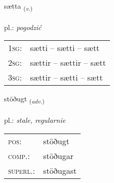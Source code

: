 \documentclass[frontgrid, backgrid]{flacards}\usepackage[]{graphicx}\usepackage[]{xcolor}
\begin{document}
\renewcommand{\flhead}{\vskip5pt \fboxsep=0pt {\small\bfseries\footnotesize Sagnorð | Verb}}
\renewcommand{\fcfoot}{\vskip5pt \fboxsep=0pt \hspace{2pt}{\small\bfseries\footnotesize 2K}}

\renewcommand{\blhead}{\vskip5pt {\small\bfseries\footnotesize Sagnorð | Verb }}
\renewcommand{\bcfoot}{\vskip5pt \hspace{2pt}{\small\bfseries\footnotesize 2K}}


{sætta \small{\textsubscript{(\textit{v.})}} \\[1ex] %
\textphonetic{[saihta]} \\
pl.: \emph{pogodzić} \\  [2ex]
\renewcommand*{\arraystretch}{0.8}
\begin{tabular}{p{1cm}l}
\textsc{1sg}: & sætti -- sætti -- sætt \\ 
\textsc{2sg}: & sættir -- sættir -- sætt \\ 
\textsc{3sg}: & sættir -- sætti -- sætt \\ 
\end{tabular}
}

\renewcommand{\flhead}{\vskip5pt \fboxsep=0pt {\small\bfseries\footnotesize Atviksorð | Adverb}}
\renewcommand{\fcfoot}{\vskip5pt \fboxsep=0pt \hspace{2pt}{\small\bfseries\footnotesize 2K}}

\renewcommand{\blhead}{\vskip5pt {\small\bfseries\footnotesize Atviksorð | Adverb }}
\renewcommand{\bcfoot}{\vskip5pt \hspace{2pt}{\small\bfseries\footnotesize 2K}}


{stöðugt \small{\textsubscript{(\textit{adv.})}} \\[1ex] %
\textphonetic{[stœːðʏxt]} \\
pl.: \emph{stale, regularnie} \\  [2ex]
\renewcommand*{\arraystretch}{0.8}
\begin{tabular}{ll}
\textsc{pos}: & stöðugt \\ 
\textsc{comp.}: & stöðugar \\ 
\textsc{superl.}: & stöðugast \\
\end{tabular}
}
\end{document}
